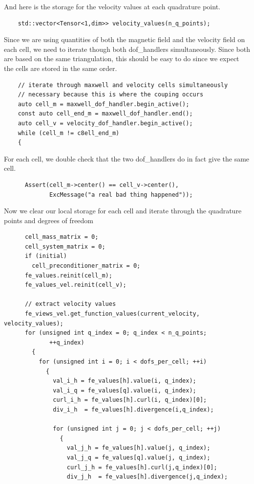 \documentclass{article}
\begin{document}
    And here is the storage for the velocity values at each quadrature point.
    \begin{lstlisting}
    std::vector<Tensor<1,dim>> velocity_values(n_q_points);
    \end{lstlisting}
Since we are using quantities of both the magnetic field and the velocity field on each cell, we need to iterate though both dof\_handlers simultaneously. Since both are based on the same triangulation, this should be easy to do since we expect the cells are stored in the same order.
\begin{lstlisting}
    // iterate through maxwell and velocity cells simultaneously
    // necessary because this is where the couping occurs
    auto cell_m = maxwell_dof_handler.begin_active();
    const auto cell_end_m = maxwell_dof_handler.end();
    auto cell_v = velocity_dof_handler.begin_active();
    while (cell_m != c8ell_end_m)
    {
        \end{lstlisting}
        For each cell, we double check that the two dof\_handlers do in fact give the same cell.
        \begin{lstlisting}
      Assert(cell_m->center() == cell_v->center(),
             ExcMessage("a real bad thing happened"));
             \end{lstlisting}
Now we clear our local storage for each cell and iterate through the quadrature points and degrees of freedom
\begin{lstlisting}
      cell_mass_matrix = 0;
      cell_system_matrix = 0;
      if (initial)
        cell_preconditioner_matrix = 0;
      fe_values.reinit(cell_m);
      fe_values_vel.reinit(cell_v);

      // extract velocity values
      fe_views_vel.get_function_values(current_velocity, velocity_values);
      for (unsigned int q_index = 0; q_index < n_q_points;
             ++q_index)
        {
          for (unsigned int i = 0; i < dofs_per_cell; ++i)
            {
              val_i_h = fe_values[h].value(i, q_index);
              val_i_q = fe_values[q].value(i, q_index);
              curl_i_h = fe_values[h].curl(i, q_index)[0];
              div_i_h  = fe_values[h].divergence(i,q_index);

              for (unsigned int j = 0; j < dofs_per_cell; ++j)
                {
                  val_j_h = fe_values[h].value(j, q_index);
                  val_j_q = fe_values[q].value(j, q_index);
                  curl_j_h = fe_values[h].curl(j,q_index)[0];
                  div_j_h  = fe_values[h].divergence(j,q_index);
\end{lstlisting}
\end{document}

